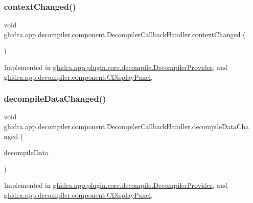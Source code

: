 \subsubsection{\texorpdfstring{contextChanged()}{contextChanged()}}
{\footnotesize\ttfamily void ghidra.\+app.\+decompiler.\+component.\+Decompiler\+Callback\+Handler.\+context\+Changed (\begin{DoxyParamCaption}{ }\end{DoxyParamCaption})}



Implemented in \mbox{\hyperlink{classghidra_1_1app_1_1plugin_1_1core_1_1decompile_1_1_decompiler_provider_a3a75d45714ac350137e8a1cef08a2241}{ghidra.\+app.\+plugin.\+core.\+decompile.\+Decompiler\+Provider}}, and \mbox{\hyperlink{classghidra_1_1app_1_1decompiler_1_1component_1_1_c_display_panel_ae71133a49eecc3ace39aa4d2eb671c4b}{ghidra.\+app.\+decompiler.\+component.\+C\+Display\+Panel}}.

\mbox{\label{interfaceghidra_1_1app_1_1decompiler_1_1component_1_1_decompiler_callback_handler_a317fd8c2d45cf2bef9ab0e15f4f7ed30}} 
\subsubsection{\texorpdfstring{decompileDataChanged()}{decompileDataChanged()}}
{\footnotesize\ttfamily void ghidra.\+app.\+decompiler.\+component.\+Decompiler\+Callback\+Handler.\+decompile\+Data\+Changed (\begin{DoxyParamCaption}\item[{\mbox{\hyperlink{classghidra_1_1app_1_1decompiler_1_1component_1_1_decompile_data}{Decompile\+Data}}}]{decompile\+Data }\end{DoxyParamCaption})}



Implemented in \mbox{\hyperlink{classghidra_1_1app_1_1plugin_1_1core_1_1decompile_1_1_decompiler_provider_a03b1fe5f65766c675710ccd7ac03bc02}{ghidra.\+app.\+plugin.\+core.\+decompile.\+Decompiler\+Provider}}, and \mbox{\hyperlink{classghidra_1_1app_1_1decompiler_1_1component_1_1_c_display_panel_a8c898c24d701d88232c06d4124523790}{ghidra.\+app.\+decompiler.\+component.\+C\+Display\+Panel}}.

